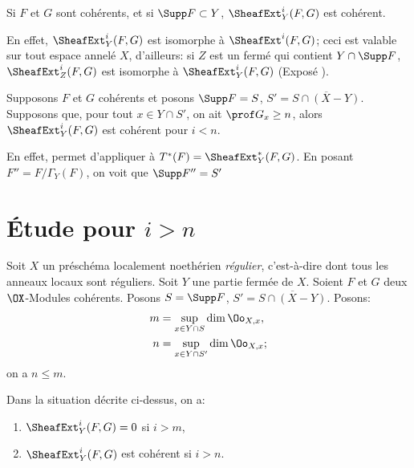 \begin{lemme}\label{VII.1.6}
Si $F$ et $G$ sont coh\'erents, et si $\Supp F \subset Y$, $\SheafExt^i_Y (F, G)$ est coh\'erent.
\end{lemme}

En effet, $\SheafExt^i_Y (F, G)$ est isomorphe \`a $\SheafExt^i (F, G)$; ceci est valable sur tout espace annel\'e $X$, d'ailleurs: si $Z$ est un ferm\'e qui contient $Y \cap \Supp F$, $\SheafExt^i_Z (F, G)$ est isomorphe \`a $\SheafExt^i_Y (F, G)$ (\cf Expos\'e ).

\begin{proposition}\label{VII.1.7}
\hspace*{3mm}Supposons $F$ et $G$ coh\'erents et posons $\Supp F = S$, $S' = \overline{S \cap (X-Y)}$. Supposons que, pour tout $x \in Y \cap S'$, on ait $\prof G_x \geq n$, alors $\SheafExt^i_Y (F, G)$ est coh\'erent pour $i < n$.
\end{proposition}

En effet,  permet d'appliquer  \`a $T^{\ast}(F) = \SheafExt^{\ast}_Y (F, G)$. En posant $F'' = F/ \Gamma_Y (F)$, on voit que $\Supp F'' = S'$

\section{\'Etude pour $i>n$}\label{VII.2}
\pageoriginale
Soit $X$ un pr\'esch\'ema localement noeth\'erien \emph{r\'egulier}, c'est-\`a-dire dont tous les anneaux locaux sont r\'eguliers. Soit $Y$ une partie ferm\'ee de $X$. Soient $F$ et $G$ deux $\OX$-Modules coh\'erents. Posons $S = \Supp F$, $S' = \overline{S \cap (X - Y)}$. Posons:
\begin{align*}
m& = \sup_{x \in Y \cap S} \dim \Oo_{X, x},\\
n &= \sup_{x \in Y \cap S'} \dim \Oo_{X, x};
\end{align*}
on a $n \leq m$.

\begin{proposition}\label{VII.2.1}
Dans la situation d\'ecrite ci-dessus, on a:
\begin{enumerate}
\item
$\SheafExt^i_Y (F, G) = 0$ si $i > m$,

\item
$\SheafExt^i_Y (F, G)$ est coh\'erent si $i > n$.
\end{enumerate}
\end{proposition}

